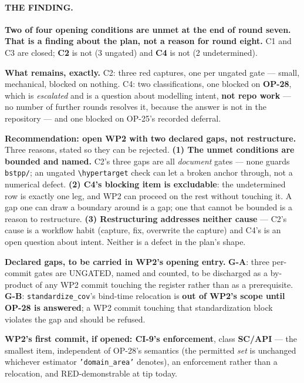 \documentclass[
  10pt,
]{article}
\begin{document}
\paragraph{THE FINDING.}
\textbf{Two of four opening conditions are unmet at the end of round seven. That is a finding about the plan, not a reason for round eight.} C1 and C3 are closed; \textbf{C2} is not (3 ungated) and \textbf{C4} is not (2 undetermined).

\textbf{What remains, exactly.} C2: three red captures, one per ungated gate --- small, mechanical, blocked on nothing. C4: two classifications, one blocked on \textbf{OP-28}, which is \emph{escalated} and is a question about modelling intent, \textbf{not repo work} --- no number of further rounds resolves it, because the answer is not in the repository --- and one blocked on OP-25's recorded deferral.

\textbf{Recommendation: open WP2 with two declared gaps, not restructure.} Three reasons, stated so they can be rejected. \textbf{(1) The unmet conditions are bounded and named.} C2's three gaps are all \emph{document} gates --- none guards \texttt{bstpp/}; an ungated \texttt{\textbackslash hypertarget} check can let a broken anchor through, not a numerical defect. \textbf{(2) C4's blocking item is excludable}: the undetermined row is exactly one leg, and WP2 can proceed on the rest without touching it. A gap one can draw a boundary around is a gap; one that cannot be bounded is a reason to restructure. \textbf{(3) Restructuring addresses neither cause} --- C2's cause is a workflow habit (capture, fix, overwrite the capture) and C4's is an open question about intent. Neither is a defect in the plan's shape.

\textbf{Declared gaps, to be carried in WP2's opening entry.} \textbf{G-A}: three per-commit gates are UNGATED, named and counted, to be discharged as a by-product of any WP2 commit touching the register rather than as a prerequisite. \textbf{G-B}: \texttt{standardize\_cov}'s bind-time relocation is \textbf{out of WP2's scope until OP-28 is answered}; a WP2 commit touching that standardization block violates the gap and should be refused.

\textbf{WP2's first commit, if opened: CI-9's enforcement}, class \textbf{SC/API} --- the smallest item, independent of OP-28's semantics (the permitted \emph{set} is unchanged whichever estimator \texttt{'domain\_area'} denotes), an enforcement rather than a relocation, and RED-demonstrable at tip today.
\end{document}
